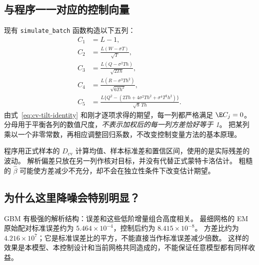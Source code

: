 \subsection{与程序一一对应的控制向量}
现有 \texttt{simulate\_batch} 函数构造以下五列：
\begin{align}
 C_1&=L-1,\label{eq:cv-c1}\\
 C_2&=\frac{L(W-\sigma T)}{\sqrt T},\label{eq:cv-c2}\\
 C_3&=\frac{L(Q-\sigma^2Th)}{\sqrt{2Th}},\label{eq:cv-c3}\\
 C_4&=\frac{L(R-\sigma^3Th^2)}{\sqrt{6Th^2}},\label{eq:cv-c4}\\
 C_5&=\frac{L\{Q^2-(2Th+4\sigma^2Th^2+\sigma^4T^2h^2)\}}{\sqrt8\,Th}.\label{eq:cv-c5}
\end{align}
由式~\eqref{eq:cv-tilt-identity} 和刚才逐项求得的期望，每一列都严格满足 $\E C_j=0$。
分母用于平衡各列的数值尺度，\emph{不表示加权后的每一列方差恰好等于 1}。
把某列乘以一个非零常数，再相应调整回归系数，不改变控制变量方法的基本原理。

程序用正式样本的 $D_{\mathrm{cv}}$ 计算均值、样本标准差和置信区间，使用的是实际残差的波动。
解析偏差只放在另一列作核对目标，并没有代替正式蒙特卡洛估计。
粗糙的 $\widehat\beta$ 可能使方差减少不充分，却不会在独立性条件下改变估计期望。

\subsection{为什么这里降噪会特别明显？}
GBM 有极强的解析结构：误差和这些低阶增量组合高度相关。
最细网格的 EM 原始配对标准误差约为 $5.464\times10^{-4}$，控制后约为 $8.415\times10^{-8}$。
方差比约为 $4.216\times10^7$；它是标准误差比的平方，不能直接当作标准误差减少倍数。
这样的效果是本模型、本控制设计和当前网格共同造成的，不能保证任意模型都有同样收益。

